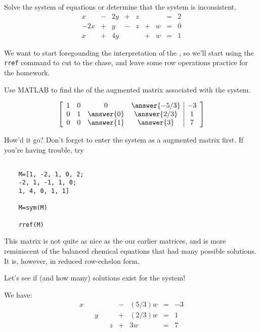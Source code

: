 \documentclass{ximera}
\begin{document}
 
\begin{example}\label{ex:freevar1} Solve the system of equations or determine that the system is inconsistent.
$$\begin{array}{ccccccccc}
      x &- &2y&+&z&&&= &2 \\
     -2x& +&y&-&z&+&w&=&0\\
     x& +&4y&&&+&w&=&1
    \end{array}$$



We want to start foregounding the interpretation of the \rref, so we'll start using the \texttt{rref} command to cut to the chase, and leave some row operations practice for the homework.

Use MATLAB to find the \rref of the augmented matrix associated with the system. 



\[\left[\begin{array}{cccc|c} 
 1&0&0&\answer{-5/3}&-3\\0&1&\answer{0}&\answer{2/3}&1\\0&0&\answer{1}&\answer{3}&7
 \end{array}\right]\]



 \begin{feedback}
 
  How'd it go? Don't forget to enter the system as a augmented matrix first. If you're having trouble, try

  \begin{verbatim}
  
    M=[1, -2, 1, 0, 2;
    -2, 1, -1, 1, 0;
    1, 4, 0, 1, 1]

    M=sym(M)

    rref(M)

  \end{verbatim}

 \end{feedback}
  
This \rref matrix is not quite as nice as the our earlier matrices, and is more reminiscent of the balanced chemical equations that had many possible solutions. It is, however, in reduced row-echelon form.  

Let's see if (and how many) solutions exist for the system!

We have:
 $$\begin{array}{ccccccccc}
      x & &&&&-&(5/3)w&= &-3 \\
     & &y&&&+&(2/3)w&=&1\\
     & &&&z&+&3w&=&7
    \end{array}$$


\end{example}
\end{document}
